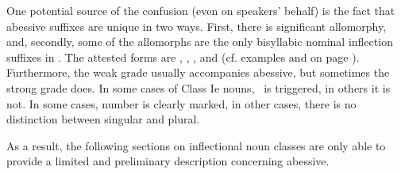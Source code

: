 One potential source of the confusion (even on speakers’ behalf) is the fact that abessive suffixes are unique in two ways. 
First, there is significant allomorphy, and, secondly, some of the allomorphs are the only bisyllabic nominal inflection suffixes in \PS. %
The attested forms are , , ,  and  (cf. examples  and  on page \pageref{abess1}). 
Furthermore, the weak grade usually accompanies abessive, but sometimes the strong grade does. In some cases of Class Ie nouns, \jvh\ is triggered, in others it is not. In some cases, number is clearly marked, in other cases, there is no distinction between singular and plural.

As a result, the following sections on inflectional noun classes are only able to provide a limited and preliminary description concerning abessive. 





